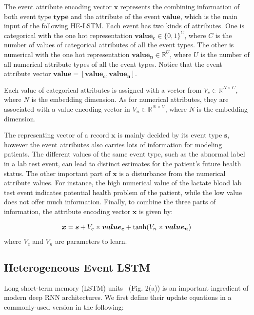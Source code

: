 \documentclass[letterpaper]{article} %
\begin{document}
The event attribute encoding vector $\bm x$ represents the combining information of both event type $\bm{type}$ and the attribute of the event $\bm{value}$, which is the main input of the following HE-LSTM.
Each event has two kinds of attributes. One is categorical with the one hot representation $\bm{value_c} \in \{0,1\}^{C}$, where $C$ is the number of values of categorical attributes of all the event types. The other is numerical with the one hot representation $\bm{value_n}\in \mathbb{R}^{U}$, where $U$ is the number of all numerical attribute  types of all the event types. Notice that the event attribute vector $\bm{value} =  \left[ \bm{value_c},\bm{value_n} \right]$.

Each value of categorical attributes is assigned with a vector from $V_c \in \mathbb{R}^{N \times C}$, where $N$ is the embedding dimension.
As for numerical attributes, they are associated with a value encoding vector in
$V_n \in \mathbb{R}^{N \times U}$, where $N$ is the embedding dimension.

The representing vector of a record $\bm x$ is mainly decided by its event type $\bm s$, however the event attributes  also carries lots of information for modeling patients.
The different values of the same event type, such as the abnormal label in a lab test event, can lead to distinct estimates for the patient's future health status. The other important part of $\bm x$ is a disturbance from the numerical attribute values. For instance, the high numerical value of the lactate blood lab test event indicates potential health problem of the patient, while the low value does not offer much information.
Finally, to combine the three parts of information, the attribute encoding vector  $\bm x$ is given by:


\begin{equation}
\setlength{\abovedisplayskip}{3pt}
\bm x = \bm s + V_c \times \bm{value_c} + \tanh( V_n \times \bm{value_n})
\setlength{\belowdisplayskip}{3pt}
\end{equation}
where   $V_c$ and $V_n$  are parameters to learn.

\subsection{Heterogeneous Event LSTM}
    
    
Long short-term memory (LSTM) units~\cite{hochreiter1997long} (Fig. 2(a)) is an important ingredient of modern deep
RNN architectures. We first define their update equations in a commonly-used version in the following:
\end{document}
